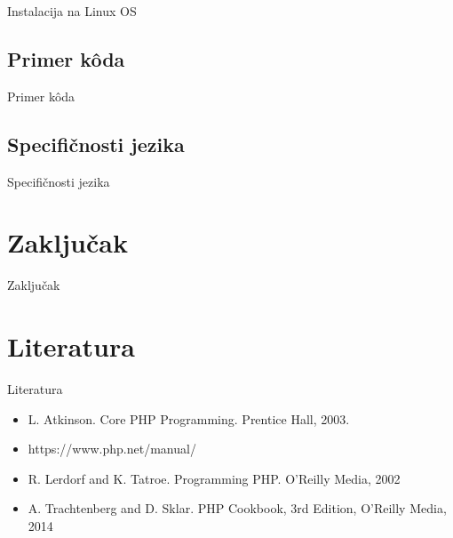 \documentclass{beamer}
\begin{document}
\begin{frame}{Instalacija na Linux OS}

\end{frame}

\subsection{Primer k\^{o}da}
\begin{frame}{Primer k\^{o}da}
    
\end{frame}

\subsection{Specifičnosti jezika}
\begin{frame}{Specifičnosti jezika}
    
\end{frame}

\section{Zaključak}
\begin{frame}{Zaključak}
    
\end{frame}

\section{Literatura}
\begin{frame}{Literatura}
    \begin{itemize}
        \item L. Atkinson. Core PHP Programming. Prentice Hall, 2003.
        \item https://www.php.net/manual/
        \item R. Lerdorf and K. Tatroe. Programming PHP. O'Reilly Media, 2002
        \item A. Trachtenberg and D. Sklar. PHP Cookbook, 3rd Edition,  O'Reilly Media, 2014
    \end{itemize}
\end{frame}
\end{document}
